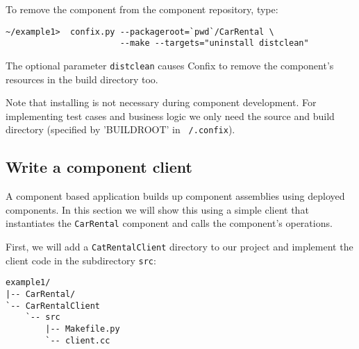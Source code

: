 To remove the component from the component repository, type:

\begin{small}
\begin{verbatim}
~/example1>  confix.py --packageroot=`pwd`/CarRental \
                       --make --targets="uninstall distclean" 
\end{verbatim}
\end{small}

The optional parameter {\tt distclean} causes Confix to remove the
component's resources in the build directory too.

Note that installing is not necessary during component development. 
For implementing test cases and business logic we only need the source and
build directory (specified by 'BUILDROOT' in {\tt ~/.confix}).
 




\newpage
\subsection{Write a component client}

A component based application builds up component assemblies using deployed 
components. In this section we will show this using a simple client that
instantiates the {\tt CarRental} component and calls the component's operations.

First, we will add a {\tt CatRentalClient} directory to our project and implement
the client code in the subdirectory {\tt src}:
\begin{small}
\begin{verbatim}
example1/
|-- CarRental/
`-- CarRentalClient
    `-- src
        |-- Makefile.py
        `-- client.cc
\end{verbatim}
\end{small}

